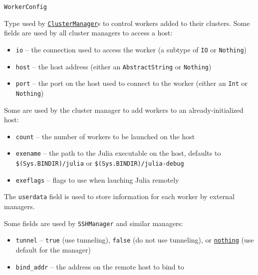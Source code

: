 \begin{adjustwidth}{2em}{0pt}


\begin{verbatim}
WorkerConfig
\end{verbatim}

Type used by \hyperlink{1673650075671996993}{\texttt{ClusterManager}}s to control workers added to their clusters. Some fields are used by all cluster managers to access a host:

\begin{itemize}
\item \texttt{io} – the connection used to access the worker (a subtype of \texttt{IO} or \texttt{Nothing})


\item \texttt{host} – the host address (either an \texttt{AbstractString} or \texttt{Nothing})


\item \texttt{port} – the port on the host used to connect to the worker (either an \texttt{Int} or \texttt{Nothing})

\end{itemize}
Some are used by the cluster manager to add workers to an already-initialized host:

\begin{itemize}
\item \texttt{count} – the number of workers to be launched on the host


\item \texttt{exename} – the path to the Julia executable on the host, defaults to \texttt{{\textquotedbl}\$(Sys.BINDIR)/julia{\textquotedbl}} or \texttt{{\textquotedbl}\$(Sys.BINDIR)/julia-debug{\textquotedbl}}


\item \texttt{exeflags} – flags to use when lauching Julia remotely

\end{itemize}
The \texttt{userdata} field is used to store information for each worker by external managers.

Some fields are used by \texttt{SSHManager} and similar managers:

\begin{itemize}
\item \texttt{tunnel} – \texttt{true} (use tunneling), \texttt{false} (do not use tunneling), or \hyperlink{9331422207248206047}{\texttt{nothing}} (use default for the manager)


\item \texttt{bind\_addr} – the address on the remote host to bind to



\end{itemize}
\end{adjustwidth}
